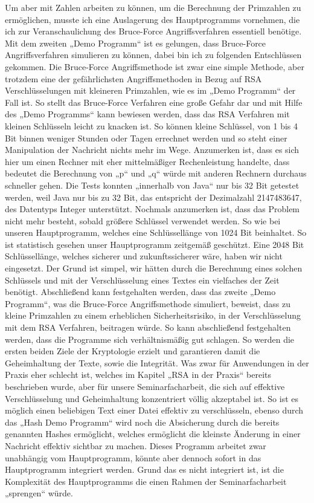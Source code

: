 Um aber mit Zahlen arbeiten zu können, um die Berechnung der Primzahlen zu ermöglichen, musste ich eine Auslagerung des Hauptprogramms vornehmen, die ich zur Veranschaulichung des Bruce-Force Angriffsverfahren essentiell benötige. Mit dem zweiten „Demo Programm“ ist es gelungen, dass Bruce-Force Angriffsverfahren simulieren zu können, dabei bin ich zu folgenden Entschlüssen gekommen. Die Bruce-Force Angriffsmethode ist zwar eine simple Methode, aber trotzdem eine der gefährlichsten Angriffsmethoden in Bezug auf RSA Verschlüsselungen mit kleineren Primzahlen, wie es im „Demo Programm“ der Fall ist. So stellt das Bruce-Force Verfahren eine große Gefahr dar und mit Hilfe des „Demo Programms“ kann bewiesen werden, dass das RSA Verfahren mit kleinen Schlüsseln leicht zu knacken ist. So können kleine Schlüssel, von 1 bis 4 Bit binnen weniger Stunden oder Tagen errechnet werden und so steht einer Manipulation der Nachricht nichts mehr im Wege. Anzumerken ist, dass es sich hier um einen Rechner mit eher mittelmäßiger Rechenleistung handelte, dass bedeutet die Berechnung von „p“ und „q“ würde mit anderen Rechnern durchaus schneller gehen. Die Tests konnten „innerhalb von Java“ nur bis 32 Bit getestet werden, weil Java nur bis zu 32 Bit, das entspricht der Dezimalzahl 2147483647, des Datentyps Integer unterstützt. Nochmals anzumerken ist, dass das Problem nicht mehr besteht, sobald größere Schlüssel verwendet werden. So wie bei unseren Hauptprogramm, welches eine Schlüssellänge von 1024 Bit beinhaltet. So ist statistisch gesehen unser Hauptprogramm zeitgemäß geschützt. Eine 2048 Bit Schlüssellänge, welches sicherer und zukunftssicherer wäre, haben wir nicht eingesetzt. Der Grund ist simpel, wir hätten durch die Berechnung eines solchen Schlüssels und mit der Verschlüsselung eines Textes ein vielfaches der Zeit benötigt. Abschließend kann festgehalten werden, dass das zweite „Demo Programm“, was die Bruce-Force Angriffsmethode simuliert, beweist, dass zu kleine Primzahlen zu einem erheblichen Sicherheitsrisiko, in der Verschlüsselung mit dem RSA Verfahren, beitragen würde. So kann abschließend festgehalten werden, dass die Programme sich verhältnismäßig gut schlagen. So werden die ersten beiden Ziele der Kryptologie erzielt und garantieren damit die Geheimhaltung der Texte, sowie die Integrität. Was zwar für Anwendungen in der Praxis eher schlecht ist, welches im Kapitel „RSA in der Praxis“ bereits beschrieben wurde, aber für unsere Seminarfacharbeit, die sich auf effektive Verschlüsselung und Geheimhaltung konzentriert völlig akzeptabel ist. So ist es möglich einen beliebigen Text einer Datei effektiv zu verschlüsseln, ebenso durch das „Hash Demo Programm“ wird noch die Absicherung durch die bereits genannten Hashes ermöglicht, welches ermöglicht die kleinste Änderung in einer Nachricht effektiv sichtbar zu machen. Dieses Programm arbeitet zwar unabhängig vom Hauptprogramm, könnte aber dennoch sofort in das Hauptprogramm integriert werden. Grund das es nicht integriert ist, ist die Komplexität des Hauptprogramms die einen Rahmen der Seminarfacharbeit „sprengen“ würde. \\
